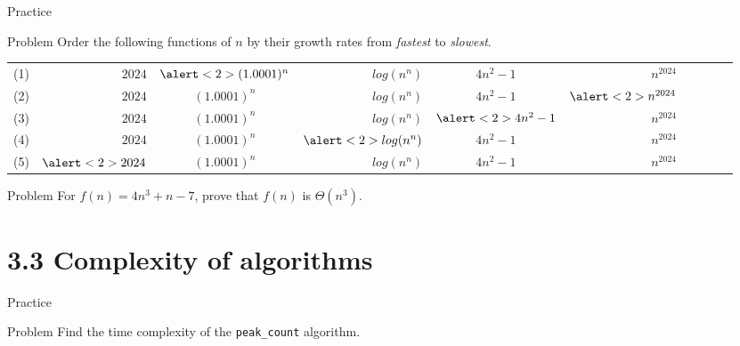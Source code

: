 \documentclass[dvipsnames,t]{beamer}
\begin{document}
\begin{frame}{Practice}
\begin{block}{Problem}
Order the following functions of $n$ by their growth rates from \textit{fastest} to \textit{slowest}.
\begin{center}
\begin{tabular}{ cr cr cr cr cr }
(1) & $2024$ & $\alert<2>{(1.0001)^n}$ & $log(n^n)$ & $4n^2-1$ & $n^{2024}$ \\
(2) & $2024$ & $(1.0001)^n$ & $log(n^n)$ & $4n^2-1$ & $\alert<2>{n^{2024}}$ \\
(3) & $2024$ & $(1.0001)^n$ & $log(n^n)$ & $\alert<2>{4n^2-1}$ & $n^{2024}$ \\
(4) & $2024$ & $(1.0001)^n$ & $\alert<2>{log(n^n)}$ & $4n^2-1$ & $n^{2024}$ \\
(5) & $\alert<2>{2024}$ & $(1.0001)^n$ & $log(n^n)$ & $4n^2-1$ & $n^{2024}$
\end{tabular}
\end{center}
\end{block}

\begin{block}{Problem}
For $f(n)=4n^3+n-7$, prove that $f(n)$ is $\Theta(n^3)$.
\end{block}

\end{frame}

\section{3.3 Complexity of algorithms}

\begin{frame}{Practice}
\begin{block}{Problem}
	Find the time complexity of the \texttt{peak\_count} algorithm.
\end{block}
\end{frame}
\end{document}
